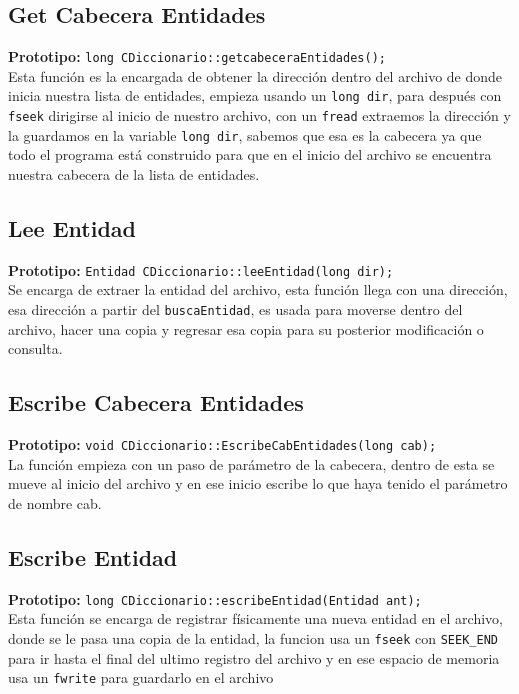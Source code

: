 \documentclass[12pt]{article}
\begin{document}
{}
\subsection*{Get Cabecera Entidades}
\textbf{Prototipo:} \verb|long CDiccionario::getcabeceraEntidades();|\\
Esta función es la encargada de obtener la dirección dentro del archivo de donde inicia nuestra lista
de entidades, empieza usando un \verb|long dir|, para después con \verb|fseek| dirigirse
al inicio de nuestro archivo, con un \verb|fread| extraemos la dirección y la guardamos en la variable
\verb|long dir|, sabemos que esa es la cabecera ya que todo el programa está construido para que en el inicio
del archivo se encuentra nuestra cabecera de la lista de entidades.

{}
\subsection*{Lee Entidad}
\textbf{Prototipo:} \verb|Entidad CDiccionario::leeEntidad(long dir);|\\
Se encarga de extraer la entidad del archivo, esta función llega con una
dirección, esa dirección a partir del \verb|buscaEntidad|, es usada para
moverse dentro del archivo, hacer una copia y regresar esa copia para su
posterior modificación o consulta.

{}
\subsection*{Escribe Cabecera Entidades}
\textbf{Prototipo:} \verb|void CDiccionario::EscribeCabEntidades(long cab);|\\
La función empieza con un paso de parámetro de la cabecera, dentro de esta
se mueve al inicio del archivo y en ese inicio escribe lo que haya tenido
el parámetro de nombre cab.

{}
\subsection*{Escribe Entidad}
\textbf{Prototipo:} \verb|long CDiccionario::escribeEntidad(Entidad ant);|\\
Esta función se encarga de registrar físicamente una nueva entidad en el archivo,
donde se le pasa una copia de la entidad, la funcion usa un \verb|fseek| con \verb|SEEK_END|
para ir hasta el final del ultimo registro del archivo y en ese espacio de memoria
usa un \verb|fwrite| para guardarlo en el archivo
\end{document}
